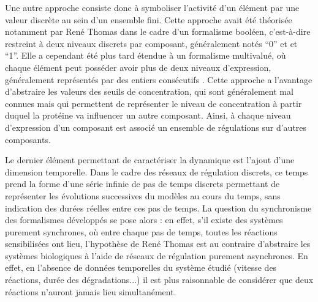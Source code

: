 Une autre approche consiste donc à symboliser l'activité d'un élément par
une valeur discrète au sein d'un ensemble fini.
Cette approche avait été théorisée notamment par René Thomas 
dans le cadre d'un formalisme booléen,
c'est-à-dire restreint à deux niveaux discrets par composant, généralement notés “0” et et “1”.
Elle a cependant été plus tard étendue à un formalisme multivalué,
où chaque élément peut posséder avoir plus de deux niveaux d'expression,
généralement représentés par des entiers consécutifs
.
Cette approche a l'avantage d'abstraire les valeurs des seuils de concentration,
qui sont généralement mal connues
mais qui permettent de représenter le niveau de concentration
à partir duquel la protéine va influencer un autre composant.
Ainsi, à chaque niveau d'expression d'un composant est associé un ensemble de régulations
sur d'autres composants.

Le dernier élément permettant de caractériser la dynamique est l'ajout d'une
dimension temporelle.
Dans le cadre des réseaux de régulation discrets, ce temps prend la forme d'une série
infinie de pas de temps discrets permettant de représenter les évolutions
successives du modèles au cours du temps, sans indication des durées réelles
entre ces pas de temps.
La question du synchronisme des formalismes développés se pose alors :
en effet, s'il existe des systèmes purement synchrones, où entre chaque pas de temps,
toutes les réactions sensibilisées ont lieu,
l'hypothèse de René Thomas \tocite[Thomas'73 ?]
est au contraire d'abstraire les systèmes biologiques à l'aide
de réseaux de régulation purement asynchrones.
En effet, en l'absence de données temporelles du système étudié
(vitesse des réactions, durée des dégradations...)
il est plus raisonnable de considérer que deux réactions n'auront jamais lieu simultanément.

